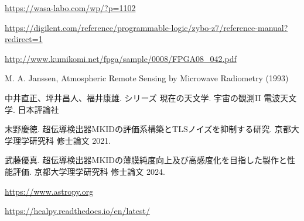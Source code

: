 \begin{thebibliography}{99}
\href{https://wasa-labo.com/wp/?p=1102}{https://wasa-labo.com/wp/?p=1102}

\href{https://digilent.com/reference/programmable-logic/zybo-z7/reference-manual?redirect=1}{https://digilent.com/reference/programmable-logic/zybo-z7/reference-manual?redirect=1}


\href{http://www.kumikomi.net/fpga/sample/0008/FPGA08\_042.pdf}{http://www.kumikomi.net/fpga/sample/0008/FPGA08\_042.pdf}


M. A. Janssen, Atmospheric Remote Sensing by Microwave Radiometry (1993)

中井直正、坪井昌人、福井康雄. シリーズ  現在の天文学. 宇宙の観測I\hspace{-1.2pt}I  電波天文学. 日本評論社

末野慶徳. 超伝導検出器MKIDの評価系構築とTLSノイズを抑制する研究. 京都大学理学研究科 修士論文 2021.

武藤優真. 超伝導検出器MKIDの薄膜純度向上及び高感度化を目指した製作と性能評価. 京都大学理学研究科 修士論文 2024.

\href{https://www.astropy.org}{https://www.astropy.org}

\href{https://healpy.readthedocs.io/en/latest/}{https://healpy.readthedocs.io/en/latest/}


\end{thebibliography}
